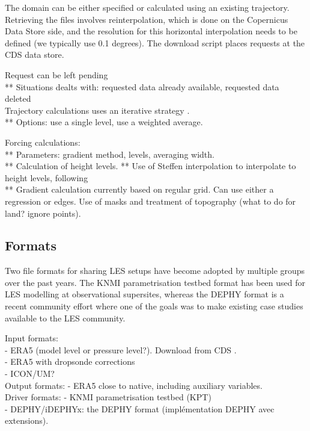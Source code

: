 \documentclass[a4paper,11pt]{article}
\begin{document}
The domain can be either specified or calculated using an existing
trajectory. Retrieving the files involves reinterpolation, which is
done on the Copernicus Data Store side, and the resolution for this
horizontal interpolation needs to be defined (we typically use 0.1
degrees). The download script places requests at the CDS data store.

Request can be left pending \\ ** Situations dealts with: requested
data already available, requested data deleted \\

Trajectory calculations uses an iterative strategy \citep{petterssen1956,sprenger2015}. \\
** Options: use a single level, use a weighted average.

Forcing calculations: \\
** Parameters: gradient method, levels, averaging width. \\
** Calculation of height levels.
** Use of Steffen interpolation to interpolate to height levels, following \cite{yamaguchi2012} \\
** Gradient calculation currently based on regular grid. Can use either a regression or edges. Use of masks and treatment of topography (what to do for land? ignore points). \\

\subsection{Formats}

Two file formats for sharing LES setups have become adopted by multiple
groups over the past years. The KNMI parametrisation
testbed format has been used for LES modelling at observational
supersites, whereas the DEPHY format is a recent community effort where
one of the goals was to make existing case studies available to the LES
community.

Input formats: \\
- ERA5 (model level or pressure level?). Download from CDS \citep{raoult2017}. \\
- ERA5 with dropsonde corrections \citep{bony2019} \\
- ICON/UM? \\

Output formats:
- ERA5 close to native, including auxiliary variables. \\

Driver formats:
- KNMI parametrisation testbed (KPT) \\
- DEPHY/iDEPHYx: the DEPHY format (impl\'ementation DEPHY avec extensions). \\
\end{document}
